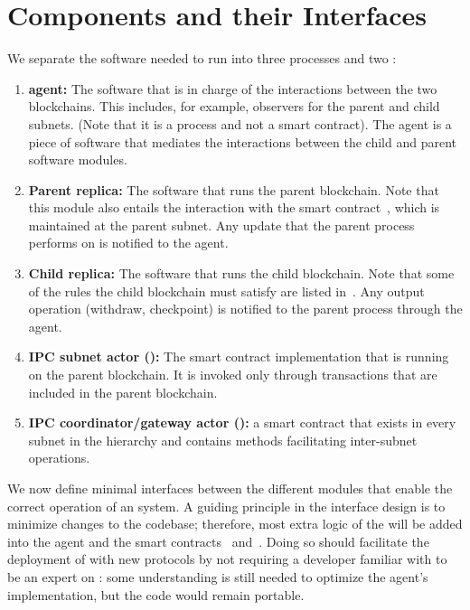  \section{Components and their Interfaces}
 \label{sec:components}
We separate the software needed to run \ipc into three processes and two \dapps:

\begin{enumerate}
    \item \textbf{\ipc agent:} The software that is in charge of the interactions between the two blockchains. This includes, for example, observers for the parent and child subnets. (Note that it is a process and not a smart contract). The \ipc agent is a piece of software that mediates the interactions between the child and parent \smr software modules.    
    \item \textbf{Parent \smr replica:} The software that runs the parent blockchain. Note that this module also entails the interaction with the \ipc smart contract~\sa, which is maintained at the parent subnet. Any update that the parent process performs on \sa is notified to the \ipc agent.
    \item \textbf{Child \smr replica:} The software that runs the child blockchain. Note that some of the rules the child blockchain must satisfy are listed in~\sa. Any output operation (withdraw, checkpoint) is notified to the parent process through the \ipc agent. 
    \item \textbf{IPC subnet actor (\sa):} The smart contract implementation that is running on the parent blockchain. It is invoked only through transactions that are included in the parent blockchain.
    \item \textbf{IPC coordinator/gateway actor (\gw):} a smart contract that exists in every subnet in the \ipc hierarchy and contains methods facilitating inter-subnet operations.	
\end{enumerate}


We now define minimal interfaces between the different modules that enable the correct operation of an \ipcFull system.
A guiding principle in the interface design is to minimize changes to the \smr codebase; therefore, most extra logic of the \ipc will be added into the \ipc agent and the smart contracts \sa~and~\gw. Doing so should facilitate the deployment of \ipc with new \smr protocols by not requiring a developer familiar with \ipc to be an expert on \smr: some understanding is still needed to optimize the agent's implementation, but the \smr code would remain portable.

